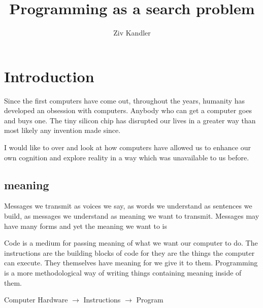 \documentclass[a4paper]{article}
\title{\Huge{Programming as a search problem}}
\author{Ziv Kandler}
\begin{document}
\section{Introduction}
Since the first computers have come out, throughout the years, humanity has 
developed an obsession with computers. Anybody who can get a computer 
goes and buys one. The tiny silicon chip has disrupted our lives in a greater
way than most likely any invention made since.

I would like to over and look at how computers have allowed us to enhance our 
own cognition and explore reality in a way which was unavailable to us before.





\subsection{meaning}

Messages we transmit as voices we say, as words we understand as sentences we 
build, as messages we understand as meaning we want to transmit.
Messages may have many forms and yet the meaning we want to is 

Code is a medium for passing meaning of what we want our computer to do. The instructions are the building blocks of code for they are the things the computer can execute. They themselves have meaning for we give it to them. Programming is a more methodological way of writing things containing meaning inside of them.  


Computer Hardware $\to$ Instructions $\to$ Program
\end{document}
